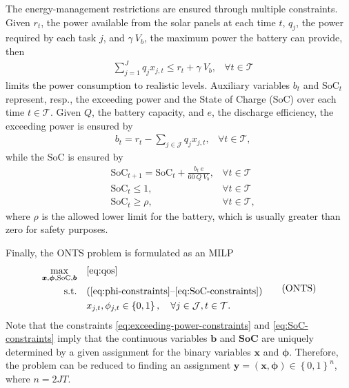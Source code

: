 The energy-management restrictions are ensured through multiple constraints.
Given $r_t$, the power available from the solar panels at each time $t$, $q_j$, the power required by each task $j$, and $\gamma~V_{b}$, the maximum power the battery can provide, then
\begin{equation}\label{eq:power-consumption-constraints}
    \begin{aligned}
	&\sum_{j=1}^{J} q_{j} x_{j,t} \leq r_t + \gamma~V_{b}, & \forall t\in\mathcal{T}
    \end{aligned}
\end{equation}
limits the power consumption to realistic levels.
Auxiliary variables $b_t$ and $\text{SoC}_t$ represent, resp., the exceeding power and the State of Charge (SoC) over each time $t\in \mathcal{T}$.
Given $Q$, the battery capacity, and $e$, the discharge efficiency, the exceeding power is ensured by
\begin{equation}\label{eq:exceeding-power-constraints}
    \begin{aligned}
	& b_{t} = r_{t} - \sum_{j \in \mathcal{J}} q_{j} x_{j,t}, &  \forall t \in \mathcal{T}
    ,\end{aligned}
\end{equation}
while the SoC is ensured by
\begin{equation}\label{eq:SoC-constraints}
    \begin{aligned}
    &\text{SoC}_{t+1} = \text{SoC}_{t} + \frac{b_{t}~e}{60~Q~V_{b}}, & \forall t \in \mathcal{T}  \\
    &\text{SoC}_{t} \leq 1, & \forall t\in\mathcal{T}    \\
    &\text{SoC}_{t} \geq \rho, & \forall t\in\mathcal{T}
    ,\end{aligned}
\end{equation}
where $\rho$ is the allowed lower limit for the battery, which is usually greater than zero for safety purposes.

Finally, the ONTS problem is formulated as an MILP
\begin{equation}\label{eq:onts-milp}
\begin{aligned}
    \max_{\bm{x},\bm{\phi},\bm{\text{SoC}},\bm{b}} \quad & \eqref{eq:qos} \\
    \textrm{s.t.} \quad & (\ref{eq:phi-constraints} \text{--} \ref{eq:SoC-constraints}) \\
	    & x_{j,t}, \phi_{j,t} \in \left\{ 0,1 \right\} ,\quad \forall j\in \mathcal{J}, t\in \mathcal{T}
.\end{aligned} \tag{ONTS}
\end{equation}
Note that the constraints \eqref{eq:exceeding-power-constraints} and \eqref{eq:SoC-constraints} imply that the continuous variables $\bm{b}$ and $\bm{\text{SoC}}$ are uniquely determined by a given assignment for the binary variables $\bm{x}$ and $\bm{\phi}$.
Therefore, the problem can be reduced to finding an assignment $\bm{y}=(\bm{x},\bm{\phi}) \in \left\{ 0,1 \right\}^{n}$, where $n=2JT$.

